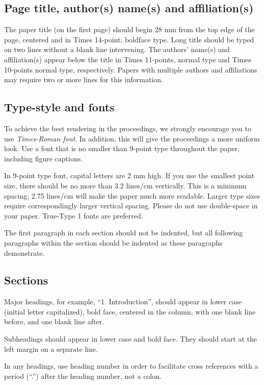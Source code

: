 \documentclass[10pt,twocolumn]{conference}
\begin{document}
\subsection{Page title, author(s) name(s) and affiliation(s)}
\noindent
The paper title (on the first page) should begin 28 mm from the top edge of the page, centered and in Times 14-point, boldface type.  Long title should be typed on two lines without a blank line intervening. The authors' name(s) and affiliation(s) appear below the title in Times 11-points, normal type and Times 10-points normal type, respectively. Papers with multiple authors and affiliations may require two or more lines for this information.

\subsection{Type-style and fonts}
\noindent
To achieve the best rendering in the proceedings, we strongly encourage you to use {\em Times-Roman font}. In addition, this will give the proceedings a more uniform look.  Use a font that is no smaller than 9-point type throughout the paper, including figure captions.

In 9-point type font, capital letters are 2 mm high.  If you use the smallest point size, there should be no more than 3.2 lines/cm vertically.  This is a minimum spacing; 2.75 lines/cm will make the paper much more readable.  Larger type sizes require correspondingly larger vertical spacing.  Please do not use double-space in your paper.  True-Type 1 fonts are preferred.

The first paragraph in each section should not be indented, but all following paragraphs within the section should be indented as these paragraphs demonstrate.

\subsection{Sections}
\noindent
Major headings, for example, ``1. Introduction'', should appear in lower case (initial letter capitalized), bold face, centered in the column, with one blank line before, and one blank line after.

Subheadings should appear in lower case and bold face.  They should start at the left margin on a separate line.

In any headings, use heading number in order to facilitate cross references with a period (``.'') after the heading number, not a colon.
\end{document}
